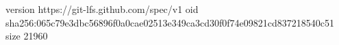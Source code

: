 version https://git-lfs.github.com/spec/v1
oid sha256:065c79e3dbc56896f0a0cae02513e349ca3cd30f0f74e09821cd837218540c51
size 21960
